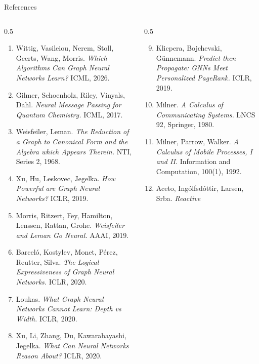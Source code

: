 \documentclass[10pt,aspectratio=169,draft]{beamer}
\begin{document}
\begin{frame}{References}
  \tiny
  \begin{columns}[T]
    \begin{column}{0.5\textwidth}
      \begin{enumerate}
        \item Wittig, Vasileiou, Nerem, Stoll, Geerts, Wang, Morris.
          \emph{Which Algorithms Can Graph Neural Networks Learn?} ICML, 2026.
        \item Gilmer, Schoenholz, Riley, Vinyals, Dahl. \emph{Neural Message
          Passing for Quantum Chemistry.} ICML, 2017.
        \item Weisfeiler, Leman. \emph{The Reduction of a Graph to Canonical
          Form and the Algebra which Appears Therein.} NTI, Series 2, 1968.
        \item Xu, Hu, Leskovec, Jegelka. \emph{How Powerful are Graph Neural
          Networks?} ICLR, 2019.
        \item Morris, Ritzert, Fey, Hamilton, Lenssen, Rattan, Grohe.
          \emph{Weisfeiler and Leman Go Neural.} AAAI, 2019.
        \item Barcel\'o, Kostylev, Monet, P\'erez, Reutter, Silva. \emph{The
          Logical Expressiveness of Graph Neural Networks.} ICLR, 2020.
        \item Loukas. \emph{What Graph Neural Networks Cannot Learn: Depth
          vs Width.} ICLR, 2020.
        \item Xu, Li, Zhang, Du, Kawarabayashi, Jegelka. \emph{What Can
          Neural Networks Reason About?} ICLR, 2020.
      \end{enumerate}
    \end{column}
    \begin{column}{0.5\textwidth}
      \begin{enumerate}
        \setcounter{enumi}{8}
        \item Klicpera, Bojchevski, G\"unnemann. \emph{Predict then
          Propagate: GNNs Meet Personalized PageRank.} ICLR, 2019.
        \item Milner. \emph{A Calculus of Communicating Systems.} LNCS 92,
          Springer, 1980.
        \item Milner, Parrow, Walker. \emph{A Calculus of Mobile Processes,
          I and II.} Information and Computation, 100(1), 1992.
        \item Aceto, Ing\'olfsd\'ottir, Larsen, Srba. \emph{Reactive
}
\end{enumerate}
\end{column}
\end{columns}
\end{frame}
\end{document}
